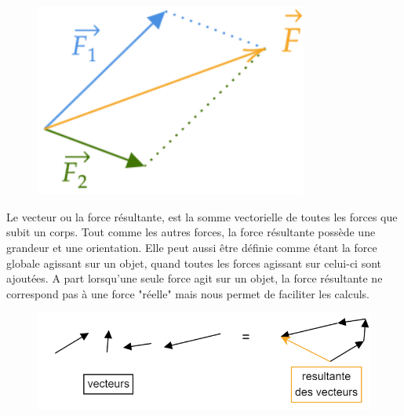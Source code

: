 \documentclass[
	11pt, %
	fleqn, %
	a4paper, %
]{LegrandOrangeBook}
\begin{document}
\noindent \begin{minipage}{0.4\textwidth}
\vspace{1cm}

\begin{figure}[H] %
	\centering %
	\includegraphics[width=0.8\textwidth]{Images/result1.png} %
\end{figure}

\end{minipage}
\hspace{0.05\textwidth}
\begin{minipage}{0.5\textwidth}

Le vecteur ou la force résultante, est la somme vectorielle de toutes les forces que subit un corps. Tout comme les autres forces, la force résultante possède une grandeur et une orientation. Elle peut aussi être définie comme étant la force globale agissant sur un objet, quand toutes les forces agissant sur celui-ci sont ajoutées. A part lorsqu'une seule force agit sur un objet, la force résultante ne correspond pas à une force "réelle" mais nous permet de faciliter les calculs.

\end{minipage}

\begin{figure}[H] %
	\centering %
	\includegraphics[width=1\textwidth]{Images/result2.png} %
\end{figure}
\end{document}
